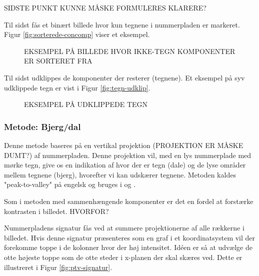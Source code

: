 SIDSTE PUNKT KUNNE MÅSKE FORMULERES KLARERE?


Til sidst fås et binært billede hvor kun tegnene i nummerpladen er markeret. Figur \vref{fig:sorterede-concomp} viser et eksempel.

\begin{figure}[htp]
  \centering
  \caption{EKSEMPEL PÅ BILLEDE HVOR IKKE-TEGN KOMPONENTER ER SORTERET FRA}
  \label{fig:sorterede-concomp}
\end{figure}


Til sidst udklippes de komponenter der resterer (tegnene). Et eksempel på syv udklippede tegn er vist i Figur \vref{fig:tegn-udklip}.

\begin{figure}[htp]
  \centering
  \caption{EKSEMPEL PÅ UDKLIPPEDE TEGN}
  \label{fig:tegn-udklip}
\end{figure}

\subsubsection*{Metode: Bjerg/dal}
Denne metode baseres på en vertikal projektion (PROJEKTION ER MÅSKE DUMT?) af nummerpladen. Denne projektion vil, med en lys nummerplade med mørke tegn, give os en indikation af hvor der er tegn (dale) og de lyse områder mellem tegnene (bjerg), hvorefter vi kan udskærer tegnene. Metoden kaldes "peak-to-valley" på engelsk og bruges i \cite{ron} og \cite{kwas}.

Som i metoden med sammenhængende komponenter er det en fordel at forstærke kontrasten i billedet. HVORFOR?

Nummerpladens signatur fås ved at summere projektionerne af alle rækkerne i billedet. Hvis denne signatur præsenteres som en graf i et koordinatsystem vil der forekomme toppe i de kolonner hvor der høj intensitet. Idéen er så at udvælge de otte højeste toppe som de otte steder i x-planen der skal skæres ved. Dette er illustreret i Figur \vref{fig:ptv-signatur}.

